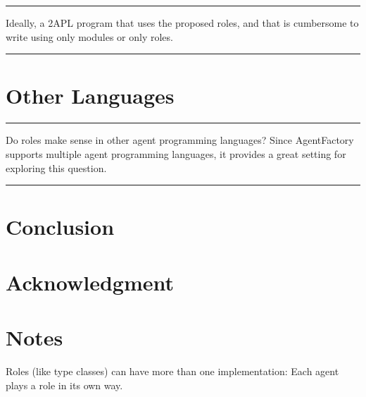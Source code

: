 \documentclass[conference,compsoc]{IEEEtran} %
\newenvironment{notes}{\medskip\hrule\nobreak\smallskip\narrower}{\smallskip\hrule\medskip}
\begin{document}
\begin{notes}
Ideally, a 2APL program that uses the proposed roles, and that is 
cumbersome to write using only modules or only roles.
\end{notes}

\section{Other Languages} %

\begin{notes}
Do roles make sense in other agent programming languages? Since AgentFactory
supports multiple agent programming languages, it provides a great setting
for exploring this question.
\end{notes}

\section{Conclusion} %

\section*{Acknowledgment}




\section*{Notes}

Roles (like type classes) can have more than one implementation: Each agent
plays a role in its own way.

\end{document}
